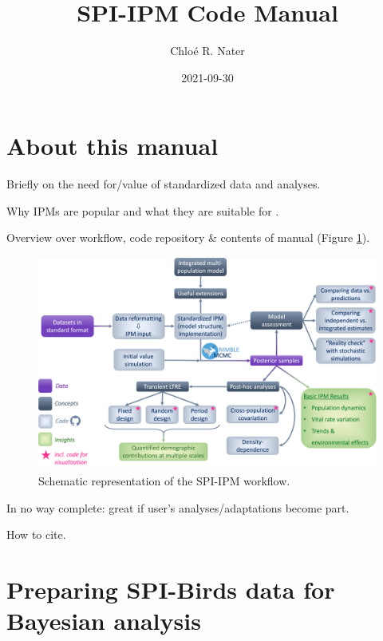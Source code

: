 \documentclass[
]{book}
\title{SPI-IPM Code Manual}
\author{Chloé R. Nater}
\date{2021-09-30}
\begin{document}
\maketitle

{
\setcounter{tocdepth}{1}
\tableofcontents
}
\hypertarget{about-this-manual}{%
\chapter*{About this manual}\label{about-this-manual}}

Briefly on the need for/value of standardized data and analyses.

Why IPMs are popular and what they are suitable for \citep{kery2011, plard2019}.

Overview over workflow, code repository \& contents of manual (Figure \ref{fig:WorkflowDiag}).

\begin{figure}

{\centering \includegraphics[width=1\linewidth]{Figures/SPI-IPM_Workflow} 

}

\caption{Schematic representation of the SPI-IPM workflow.}\label{fig:WorkflowDiag}
\end{figure}

In no way complete: great if user's analyses/adaptations become part.

How to cite.

\hypertarget{DataPrep}{%
\chapter{Preparing SPI-Birds data for Bayesian analysis}\label{DataPrep}}
\end{document}

